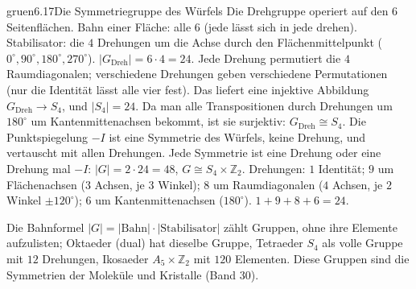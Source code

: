 \begin{loesungkarte}{gruen}{6.17}{Die Symmetriegruppe des Würfels}
Die Drehgruppe operiert auf den $6$ Seitenflächen. Bahn einer Fläche: alle $6$ (jede lässt sich in jede drehen). Stabilisator: die $4$ Drehungen um die Achse durch den Flächenmittelpunkt ($0^{\circ}, 90^{\circ}, 180^{\circ}, 270^{\circ}$). $|G_{\text{Dreh}}| = 6\cdot4 = 24$.
Jede Drehung permutiert die $4$ Raumdiagonalen; verschiedene Drehungen geben verschiedene Permutationen (nur die Identität lässt alle vier fest). Das liefert eine injektive Abbildung $G_{\text{Dreh}}\to S_4$, und $|S_4| = 24$. Da man alle Transpositionen durch Drehungen um $180^{\circ}$ um Kantenmittenachsen bekommt, ist sie surjektiv: $G_{\text{Dreh}}\cong S_4$.
Die Punktspiegelung $-I$ ist eine Symmetrie des Würfels, keine Drehung, und vertauscht mit allen Drehungen. Jede Symmetrie ist eine Drehung oder eine Drehung mal $-I$: $|G| = 2\cdot24 = 48$, $G\cong S_4\times\mathbb Z_2$.
Drehungen: $1$ Identität; $9$ um Flächenachsen ($3$ Achsen, je $3$ Winkel); $8$ um Raumdiagonalen ($4$ Achsen, je $2$ Winkel $\pm120^{\circ}$); $6$ um Kantenmittenachsen ($180^{\circ}$). $1 + 9 + 8 + 6 = 24$. \checkmark
{}
\begin{mitnehmen}\kastentext
Die Bahnformel $|G| = |\text{Bahn}|\cdot|\text{Stabilisator}|$ zählt Gruppen, ohne ihre Elemente aufzulisten; Oktaeder (dual) hat dieselbe Gruppe, Tetraeder $S_4$ als volle Gruppe mit $12$ Drehungen, Ikosaeder $A_5\times\mathbb Z_2$ mit $120$ Elementen. Diese Gruppen sind die Symmetrien der Moleküle und Kristalle (Band 30).
\end{mitnehmen}
\end{loesungkarte}

